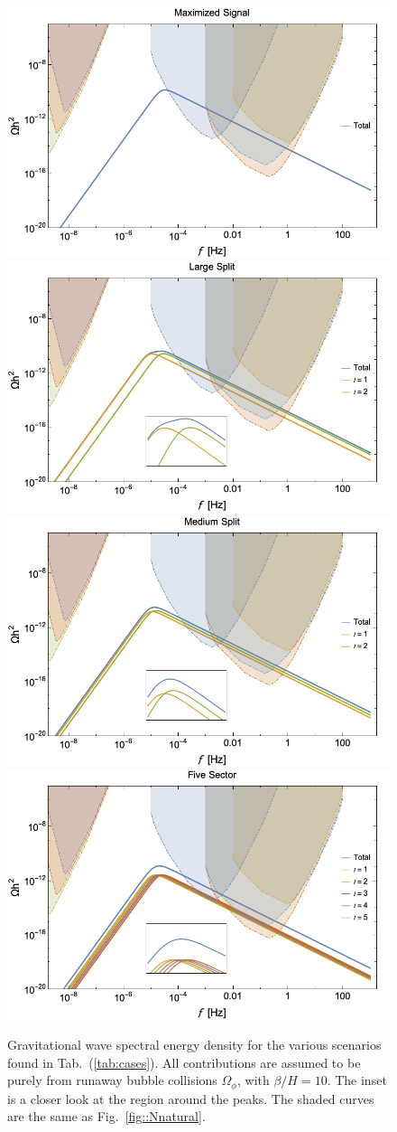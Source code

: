 \documentclass[nofootinbib,twocolumn,preprintnumbers]{revtex4-1}
\begin{document}
\begin{figure}[tb]
\centering
\begin{minipage}[c]{\textwidth}
\includegraphics[width=.45\textwidth ]{highest.png}
\hfill
\includegraphics[width=.45\textwidth]{TwoFar.png} 
\hfill
\includegraphics[width=.45\textwidth]{TwoMed.png} 
\hfill
\includegraphics[width=.45\textwidth]{energydensity.png} 
\end{minipage}
\hfill
\caption{ Gravitational wave spectral energy density for the various scenarios found in Tab.~(\ref{tab:cases}).  All contributions are assumed to be purely from runaway bubble collisions $\Omega_{\phi}$, with $\beta/H  = 10$. The inset is a closer look at the region around the peaks. The shaded curves are the same as Fig.~\ref{fig::Nnatural}.   }
\label{fig:Haa}
\end{figure}
\end{document}
